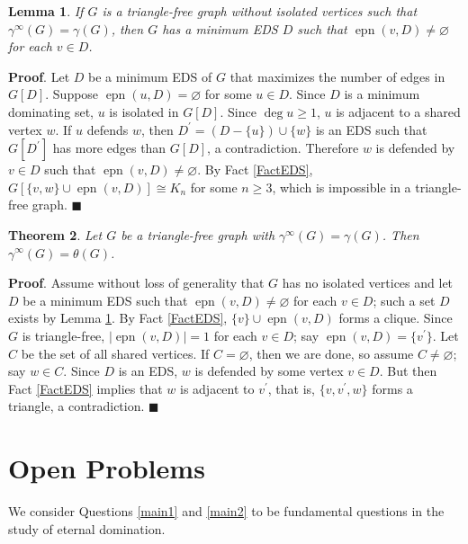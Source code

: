 \documentclass[12pt]{article}%
\newtheorem{theorem}{Theorem}[section]
\newtheorem{lemma}[theorem]{Lemma}
\begin{document}
\begin{lemma}
\label{LemT-free}If $G$ is a triangle-free graph without isolated vertices
such that $\gamma^{\infty}(G)=\gamma(G)$, then $G$ has a minimum EDS $D$ such
that $\operatorname{epn}(v,D)\neq\varnothing$ for each $v\in D$.
\end{lemma}

\noindent\textbf{Proof}.\hspace{0.1in} Let $D$ be a minimum EDS of $G$ that
maximizes the number of edges in $G[D]$. Suppose $\operatorname{epn}%
(u,D)=\varnothing$ for some $u\in D$. Since $D$ is a minimum dominating set,
$u$ is isolated in $G[D]$. Since $\deg u\geq1$, $u$ is adjacent to a shared
vertex $w$. If $u$ defends $w$, then $D^{\prime}=(D-\{u\})\cup\{w\}$ is an EDS
such that $G[D^{\prime}]$ has more edges than $G[D]$, a contradiction.
Therefore $w$ is defended by $v\in D$ such that $\operatorname{epn}%
(v,D)\neq\varnothing$. By Fact \ref{FactEDS}, $G[\{v,w\}\cup\operatorname{epn}%
(v,D)]\cong K_{n}$ for some $n\geq3$, which is impossible in a triangle-free
graph. \hfill$\blacksquare$

\begin{theorem}
Let $G$ be a triangle-free graph with $\gamma^{\infty}(G)=\gamma(G)$. Then
$\gamma^{\infty}(G)=\theta(G)$.
\end{theorem}

\noindent\textbf{Proof}.\hspace{0.1in} Assume without loss of generality that
$G$ has no isolated vertices and let $D$ be a minimum EDS such that
$\operatorname{epn}(v,D)\neq\varnothing$ for each $v\in D$; such a set $D$
exists by Lemma \ref{LemT-free}. By Fact \ref{FactEDS}, $\{v\}\cup
\operatorname{epn}(v,D)$ forms a clique. Since $G$ is triangle-free,
$|\operatorname{epn}(v,D)|=1$ for each $v\in D$; say $\operatorname{epn}%
(v,D)=\{v^{\prime}\}$. Let $C$ be the set of all shared vertices. If
$C=\varnothing$, then we are done, so assume $C\neq\varnothing$; say $w\in C$.
Since $D$ is an EDS, $w$ is defended by some vertex $v\in D$. But then Fact
\ref{FactEDS} implies that $w$ is adjacent to $v^{\prime}$, that is,
$\{v,v^{\prime},w\}$ forms a triangle, a contradiction. \hfill$\blacksquare$

\section{Open Problems}

\label{Sec_Open}We consider Questions \ref{main1} and \ref{main2} to be
fundamental questions in the study of eternal domination.
\end{document}
